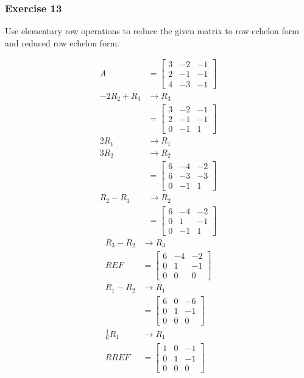\documentclass{math}
\begin{document}
\subsubsection*{Exercise 13}
Use elementary row operations to reduce the given matrix to row echelon form
and reduced row echelon form.
\begin{multicols}{2}
  \begin{align*}
    A &= \begin{bmatrix}
      3 & -2 & -1 \\
      2 & -1 & -1 \\
      4 & -3 & -1
    \end{bmatrix} \\
    -2R_2+R_3 &\to R_3 \\
    &= \begin{bmatrix}
      3 & -2 & -1 \\
      2 & -1 & -1 \\
      0 & -1 & 1
    \end{bmatrix} \\
    2R_1 &\to R_1 \\
    3R_2 &\to R_2 \\
    &= \begin{bmatrix}
      6 & -4 & -2 \\
      6 & -3 & -3 \\
      0 & -1 & 1
    \end{bmatrix} \\
    R_2-R_1 &\to R_2 \\
    &= \begin{bmatrix}
      6 & -4 & -2 \\
      0 & 1 & -1 \\
      0 & -1 & 1
    \end{bmatrix}
  \end{align*}\break
  \begin{align*}
    R_3-R_2 &\to R_3 \\
    REF &= \begin{bmatrix}
      6 & -4 & -2 \\
      0 & 1 & -1 \\
      0 & 0 & 0
    \end{bmatrix} \\
    R_1-R_2 &\to R_1 \\
    &= \begin{bmatrix}
      6 & 0 & -6 \\
      0 & 1 & -1 \\
      0 & 0 & 0
    \end{bmatrix} \\
    \frac{1}{6}R_1 &\to R_1 \\
    RREF &= \begin{bmatrix}
      1 & 0 & -1 \\
      0 & 1 & -1 \\
      0 & 0 & 0
    \end{bmatrix}
  \end{align*}
\end{multicols}
\end{document}
